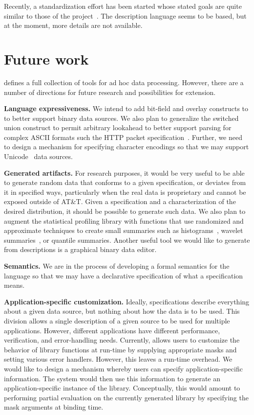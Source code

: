 \documentclass{sig-alternate}
\begin{document}
Recently, a standardization effort has been started whose stated goals are quite similar to those of the \pads{} project~\cite{dfdl}. The description
language seems to be \xml{} based, but at the moment, more details are 
not available.

\section{Future work}
\pads{} defines a full collection of tools for ad hoc data processing.
However, there are a number of directions for future research and possibilities for extension. 

\textbf{Language expressiveness.}  
We intend to add bit-field 
and overlay constructs to \pads{} to better support binary data sources.  We also plan to generalize the switched union construct to permit arbitrary lookahead to better support
parsing for complex ASCII formats such the HTTP packet specification~\cite{http}.  Further, we need to design a mechanism
for specifying character encodings so that we may support 
Unicode~\cite{unicode} data sources.

\textbf{Generated artifacts.} 
For research purposes, it would be very useful to be able to generate random data that conforms to a given specification, or 
deviates from it in specified ways, particularly when the real data is proprietary and cannot be exposed outside of AT\&T. 
Given a \pads{} specification and a characterization of the desired distribution, it should be possible to generate such data.  We also plan to augment the statistical profiling library with
functions that use randomized and approximate techniques to create
small summaries such as histograms~\cite{histograms,histograms-wavelets}, wavelet summaries~\cite{histograms-wavelets},
or quantile summaries\cite{quantiles}.
Another useful tool we 
would like to generate from \pads{} descriptions is a graphical binary data editor. 

\textbf{Semantics.}  We are in the process of developing a formal semantics for the \pads{} language so that we may have a declarative specification of what a \pads{} specification means.

\textbf{Application-specific customization.}
Ideally, \pads{} specifications describe everything about a given
data source, but nothing about how the data is to be used. This
division allows a single description of a given source to be used
for multiple applications.  However, different applications have different
performance, verification, and error-handling needs.  Currently,
\pads{} allows users to customize the behavior of library
functions at run-time by supplying appropriate masks and setting various error handlers.  However, this leaves a run-time overhead.  We would like to 
design a mechanism whereby users can specify application-specific information.  The \pads{} system would then use this information to generate an 
application-specific instance of the library.  Conceptually, this would
amount to performing partial evaluation on the currently generated \pads{} library by specifying the mask arguments at binding time.
\end{document}
